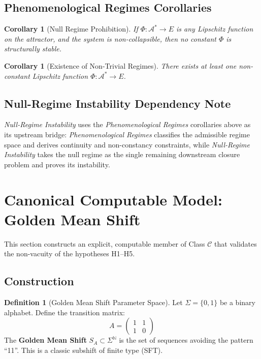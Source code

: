 \documentclass[11pt,a4paper]{article}
\theoremstyle{plain}
\newtheorem{corollary}[theorem]{Corollary}
\theoremstyle{definition}
\newtheorem{definition}[theorem]{Definition}
\newcommand{\A}{\mathcal{A}}
\begin{document}
\subsection{Phenomenological Regimes Corollaries}

\begin{corollary}[Null Regime Prohibition]
If $\Phi: \A^* \to E$ is any Lipschitz function on the attractor, and the system is non-collapsible, then no constant $\Phi$ is structurally stable.
\end{corollary}

\begin{corollary}[Existence of Non-Trivial Regimes]
There exists at least one non-constant Lipschitz function $\Phi: \A^* \to E$.
\end{corollary}

\subsection{Null-Regime Instability Dependency Note}

\textit{Null-Regime Instability} uses the \textit{Phenomenological Regimes} corollaries above as its upstream bridge: \textit{Phenomenological Regimes} classifies the admissible regime space and derives continuity and non-constancy constraints, while \textit{Null-Regime Instability} takes the null regime as the single remaining downstream closure problem and proves its instability.

\section{Canonical Computable Model: Golden Mean Shift}

This section constructs an explicit, computable member of Class $\mathscr{C}$ that validates the non-vacuity of the hypotheses H1--H5.

\subsection{Construction}

\begin{definition}[Golden Mean Shift Parameter Space]
Let $\Sigma = \{0, 1\}$ be a binary alphabet. Define the transition matrix:
\[
A = \begin{pmatrix} 1 & 1 \\ 1 & 0 \end{pmatrix}
\]
The \textbf{Golden Mean Shift} $S_A \subset \Sigma^{\mathbb{N}}$ is the set of sequences avoiding the pattern ``11''. This is a classic subshift of finite type (SFT).
\end{definition}
\end{document}
